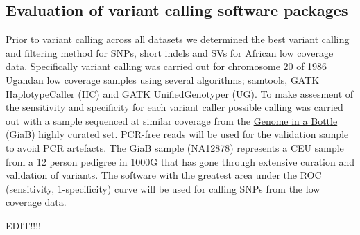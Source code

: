 \subsection{Evaluation of variant calling software packages}
Prior to variant calling across all datasets we determined the best variant calling and filtering method for SNPs, short indels and SVs for African low coverage data. Specifically variant calling was carried out for chromosome 20 of 1986 Ugandan low coverage samples using several algorithms; samtools, GATK HaplotypeCaller (HC) and GATK UnifiedGenotyper (UG). To make assesment of the sensitivity and specificity for each variant caller possible calling was carried out with a sample sequenced at similar coverage from the \href{http://genomeinabottle.org}{Genome in a Bottle (GiaB)} highly curated set. PCR-free reads will be used for the validation sample to avoid PCR artefacts. The GiaB sample (NA12878) represents a CEU sample from a 12 person pedigree in 1000G that has gone through extensive curation and validation of variants.\cite{Zook2014} The software with the greatest area under the ROC (sensitivity, 1-specificity) curve will be used for calling SNPs from the low coverage data.

EDIT!!!!

